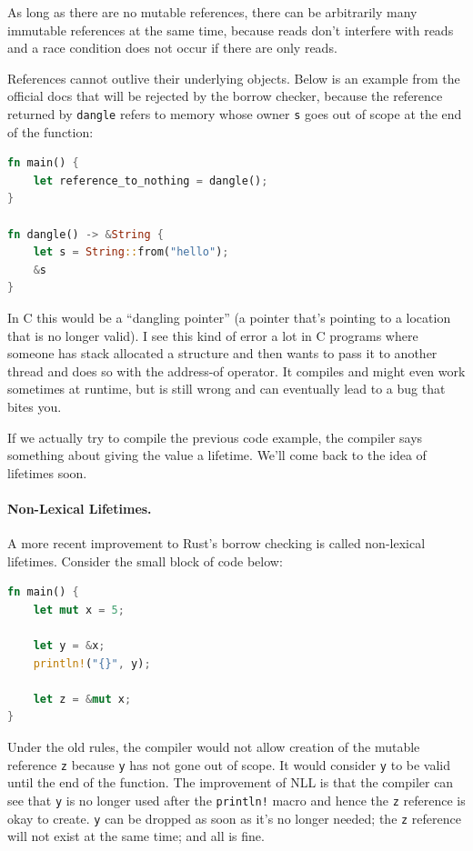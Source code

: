 As long as there are no mutable references, there can be arbitrarily many immutable references at the same time, because reads don't interfere with reads and a race condition does not occur if there are only reads. 

References cannot outlive their underlying objects. Below is an example from the official docs that will be rejected by the borrow checker, because the reference returned by \texttt{dangle} refers to memory whose owner \texttt{s} goes out of scope at the end of the function:

\begin{lstlisting}[language=Rust]
fn main() {
    let reference_to_nothing = dangle();
}

fn dangle() -> &String {
    let s = String::from("hello");
    &s
}
\end{lstlisting} 

In C this would be a ``dangling pointer'' (a pointer that's pointing to a location that is no longer valid). I see this kind of error a lot in C programs where someone has stack allocated a structure and then wants to pass it to another thread and does so with the address-of operator. It compiles and might even work sometimes at runtime, but is still wrong and can eventually lead to a bug that bites you. 

If we actually try to compile the previous code example, the compiler says something about giving the value a lifetime. We'll come back to the idea of lifetimes soon.

\paragraph{Non-Lexical Lifetimes.} A more recent improvement to Rust's borrow checking is called non-lexical lifetimes. Consider the small block of code below:
\begin{lstlisting}[language=Rust]
fn main() {
    let mut x = 5;

    let y = &x;
    println!("{}", y);

    let z = &mut x;
}
\end{lstlisting}

Under the old rules, the compiler would not allow creation of the mutable reference \texttt{z} because \texttt{y} has not gone out of scope. It would consider \texttt{y} to be valid until the end of the function. The improvement of NLL is that the compiler can see that \texttt{y} is no longer used after the \texttt{println!} macro and hence the \texttt{z} reference is okay to create. \texttt{y} can be dropped as soon as it's no longer needed; the \texttt{z} reference will not exist at the same time; and all is fine.

